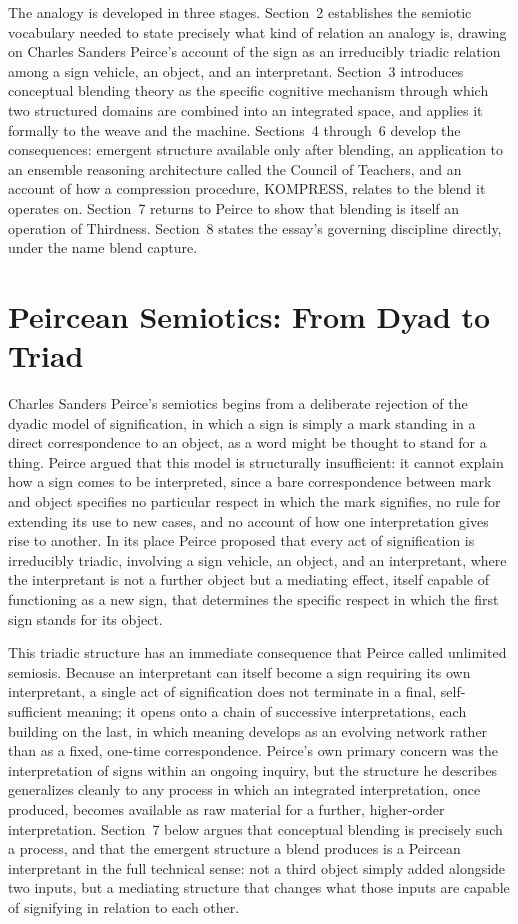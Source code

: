 \documentclass[11pt,openany]{book}
\begin{document}
The analogy is developed in three stages. Section~2 establishes the semiotic vocabulary needed to state precisely what kind of relation an analogy is, drawing on Charles Sanders Peirce's account of the sign as an irreducibly triadic relation among a sign vehicle, an object, and an interpretant. Section~3 introduces conceptual blending theory as the specific cognitive mechanism through which two structured domains are combined into an integrated space, and applies it formally to the weave and the machine. Sections~4 through~6 develop the consequences: emergent structure available only after blending, an application to an ensemble reasoning architecture called the Council of Teachers, and an account of how a compression procedure, KOMPRESS, relates to the blend it operates on. Section~7 returns to Peirce to show that blending is itself an operation of Thirdness. Section~8 states the essay's governing discipline directly, under the name blend capture.

\section{Peircean Semiotics: From Dyad to Triad}

Charles Sanders Peirce's semiotics begins from a deliberate rejection of the dyadic model of signification, in which a sign is simply a mark standing in a direct correspondence to an object, as a word might be thought to stand for a thing. Peirce argued that this model is structurally insufficient: it cannot explain how a sign comes to be interpreted, since a bare correspondence between mark and object specifies no particular respect in which the mark signifies, no rule for extending its use to new cases, and no account of how one interpretation gives rise to another. In its place Peirce proposed that every act of signification is irreducibly triadic, involving a sign vehicle, an object, and an interpretant, where the interpretant is not a further object but a mediating effect, itself capable of functioning as a new sign, that determines the specific respect in which the first sign stands for its object.

This triadic structure has an immediate consequence that Peirce called unlimited semiosis. Because an interpretant can itself become a sign requiring its own interpretant, a single act of signification does not terminate in a final, self-sufficient meaning; it opens onto a chain of successive interpretations, each building on the last, in which meaning develops as an evolving network rather than as a fixed, one-time correspondence. Peirce's own primary concern was the interpretation of signs within an ongoing inquiry, but the structure he describes generalizes cleanly to any process in which an integrated interpretation, once produced, becomes available as raw material for a further, higher-order interpretation. Section~7 below argues that conceptual blending is precisely such a process, and that the emergent structure a blend produces is a Peircean interpretant in the full technical sense: not a third object simply added alongside two inputs, but a mediating structure that changes what those inputs are capable of signifying in relation to each other.
\end{document}
